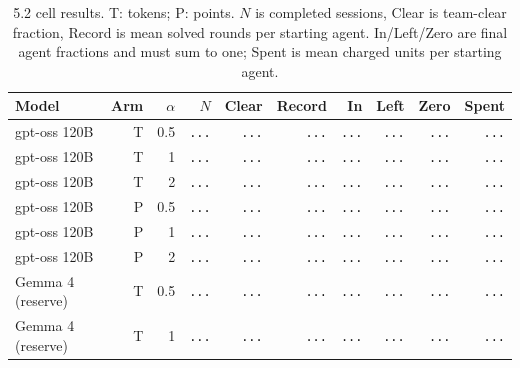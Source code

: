 \begin{table}[H]
\centering\footnotesize
\setlength{\tabcolsep}{4pt}
\caption{5.2 cell results. T: tokens; P: points. $N$ is completed sessions, Clear is team-clear fraction, Record is mean solved rounds per starting agent. In/Left/Zero are final agent fractions and must sum to one; Spent is mean charged units per starting agent.}
\label{tab:team-results}
\begin{tabular}{@{}lrrrrrrrrr@{}}
\toprule
Model & Arm & $\alpha$ & $N$ & Clear & Record & In & Left & Zero & Spent \\
\midrule
gpt-oss 120B & T & 0.5 & {\color{gray}\texttt{...}} & {\color{gray}\texttt{...}} & {\color{gray}\texttt{...}} & {\color{gray}\texttt{...}} & {\color{gray}\texttt{...}} & {\color{gray}\texttt{...}} & {\color{gray}\texttt{...}} \\
gpt-oss 120B & T & 1 & {\color{gray}\texttt{...}} & {\color{gray}\texttt{...}} & {\color{gray}\texttt{...}} & {\color{gray}\texttt{...}} & {\color{gray}\texttt{...}} & {\color{gray}\texttt{...}} & {\color{gray}\texttt{...}} \\
gpt-oss 120B & T & 2 & {\color{gray}\texttt{...}} & {\color{gray}\texttt{...}} & {\color{gray}\texttt{...}} & {\color{gray}\texttt{...}} & {\color{gray}\texttt{...}} & {\color{gray}\texttt{...}} & {\color{gray}\texttt{...}} \\
gpt-oss 120B & P & 0.5 & {\color{gray}\texttt{...}} & {\color{gray}\texttt{...}} & {\color{gray}\texttt{...}} & {\color{gray}\texttt{...}} & {\color{gray}\texttt{...}} & {\color{gray}\texttt{...}} & {\color{gray}\texttt{...}} \\
gpt-oss 120B & P & 1 & {\color{gray}\texttt{...}} & {\color{gray}\texttt{...}} & {\color{gray}\texttt{...}} & {\color{gray}\texttt{...}} & {\color{gray}\texttt{...}} & {\color{gray}\texttt{...}} & {\color{gray}\texttt{...}} \\
gpt-oss 120B & P & 2 & {\color{gray}\texttt{...}} & {\color{gray}\texttt{...}} & {\color{gray}\texttt{...}} & {\color{gray}\texttt{...}} & {\color{gray}\texttt{...}} & {\color{gray}\texttt{...}} & {\color{gray}\texttt{...}} \\
Gemma 4 (reserve) & T & 0.5 & {\color{gray}\texttt{...}} & {\color{gray}\texttt{...}} & {\color{gray}\texttt{...}} & {\color{gray}\texttt{...}} & {\color{gray}\texttt{...}} & {\color{gray}\texttt{...}} & {\color{gray}\texttt{...}} \\
Gemma 4 (reserve) & T & 1 & {\color{gray}\texttt{...}} & {\color{gray}\texttt{...}} & {\color{gray}\texttt{...}} & {\color{gray}\texttt{...}} & {\color{gray}\texttt{...}} & {\color{gray}\texttt{...}} & {\color{gray}\texttt{...}} \\

\end{tabular}
\end{table}
